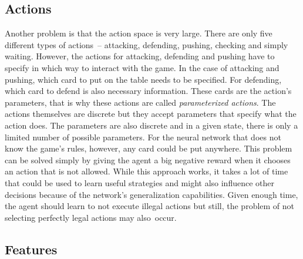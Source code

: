 \documentclass[a4paper,titlepage]{article}
\begin{document}
\subsection{Actions}
\label{sec:actions}

Another problem is that the action space is very large. There are only five different types of actions~-- attacking, defending, pushing, checking and simply waiting. However, the actions for attacking, defending and pushing have to specify in which way to interact with the game. In the case of attacking and pushing, which card to put on the table needs to be specified. For defending, which card to defend is also necessary information. These cards are the action's parameters, that is why these actions are called \emph{parameterized actions}. The actions themselves are discrete but they accept parameters that specify what the action does. The parameters are also discrete and in a given state, there is only a limited number of possible parameters. For the neural network that does not know the game's rules, however, any card could be put anywhere. This problem can be solved simply by giving the agent a big negative reward when it chooses an action that is not allowed. While this approach works, it takes a lot of time that could be used to learn useful strategies and might also influence other decisions because of the network's generalization capabilities. Given enough time, the agent should learn to not execute illegal actions but still, the problem of not selecting perfectly legal actions may also~occur.

\subsection{Features}
\label{sec:features}
\end{document}
